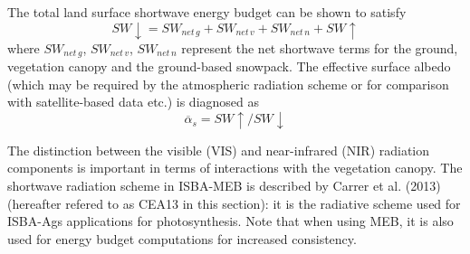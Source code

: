 %
The total land surface shortwave energy budget can be shown to satisfy
%
\begin{equation}
  \label{eq:meb_swup_resid}
SW\downarrow = SW_{net\,g} + SW_{net\,v} + SW_{net\,n} + SW\uparrow 
%
\end{equation}
%
where $SW_{net\,g}$, $SW_{net\,v}$, $SW_{net\,n}$ represent the net shortwave terms for the ground,
vegetation canopy and the ground-based snowpack.
The effective surface albedo (which may be required by the atmospheric radiation
scheme or for comparison with satellite-based data etc.) 
is diagnosed as 
%
\begin{equation}
  \label{eq:meb_swup_alb_total_eff}
{\overline\alpha}_s = SW\uparrow/SW\downarrow
%
\end{equation}

%
The distinction between the visible (VIS)
and near-infrared (NIR) radiation components is important 
in terms of interactions with the vegetation canopy. 
%
The shortwave radiation scheme in ISBA-MEB 
is described by Carrer et al. (2013)\nocite{carrer_ea_2013}
(hereafter refered to as CEA13 in this section): it is the radiative
scheme used for ISBA-Ags applications for photosynthesis. Note that
when using MEB, it is also used for energy budget computations for
increased consistency.

